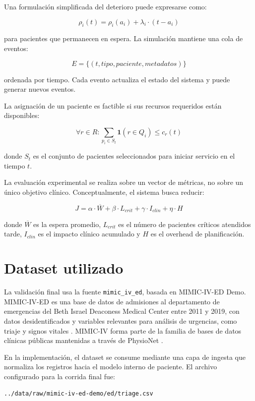 \documentclass[12pt,a4paper]{article}
\begin{document}
Una formulación simplificada del deterioro puede expresarse como:

\[
\rho_i(t) = \rho_i(a_i) + \lambda_i \cdot (t-a_i)
\]

para pacientes que permanecen en espera. La simulación mantiene una cola de eventos:

\[
E = \{(t, tipo, paciente, metadatos)\}
\]

ordenada por tiempo. Cada evento actualiza el estado del sistema y puede generar nuevos eventos.

La asignación de un paciente es factible si sus recursos requeridos están disponibles:

\[
\forall r \in R: \sum_{p_i \in S_t} \mathbf{1}(r \in Q_i) \leq c_r(t)
\]

donde $S_t$ es el conjunto de pacientes seleccionados para iniciar servicio en el tiempo $t$.

La evaluación experimental se realiza sobre un vector de métricas, no sobre un único objetivo clínico. Conceptualmente, el sistema busca reducir:

\[
J = \alpha \cdot \overline{W} + \beta \cdot L_{crit} + \gamma \cdot I_{clin} + \eta \cdot H
\]

donde $\overline{W}$ es la espera promedio, $L_{crit}$ es el número de pacientes críticos atendidos tarde, $I_{clin}$ es el impacto clínico acumulado y $H$ es el overhead de planificación.

\section{Dataset utilizado}

La validación final usa la fuente \texttt{mimic\_iv\_ed}, basada en MIMIC-IV-ED Demo. MIMIC-IV-ED es una base de datos de admisiones al departamento de emergencias del Beth Israel Deaconess Medical Center entre 2011 y 2019, con datos desidentificados y variables relevantes para análisis de urgencias, como triaje y signos vitales \cite{mimiciv_ed}. MIMIC-IV forma parte de la familia de bases de datos clínicas públicas mantenidas a través de PhysioNet \cite{mimiciv,physionet}.

En la implementación, el dataset se consume mediante una capa de ingesta que normaliza los registros hacia el modelo interno de paciente. El archivo configurado para la corrida final fue:

\begin{verbatim}
../data/raw/mimic-iv-ed-demo/ed/triage.csv
\end{verbatim}
\end{document}
